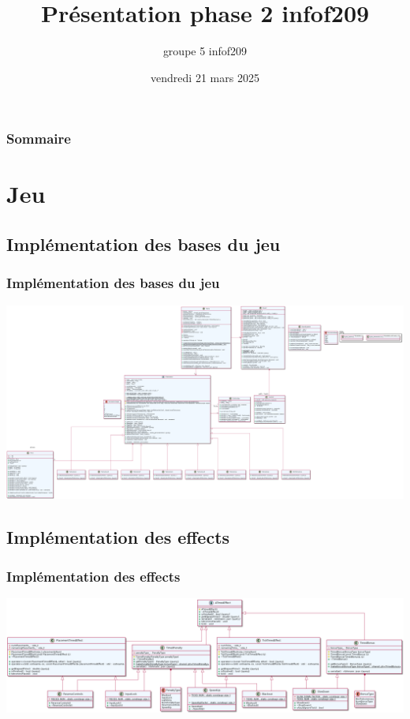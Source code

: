 \documentclass{beamer}
\title{Présentation phase 2 \textbf{infof209}}
\author{groupe 5 infof209}
\date{vendredi 21 mars 2025}
\begin{document}
\begin{frame}
\titlepage
\end{frame}

\begin{frame}[shrink=20]
\frametitle{Sommaire}
	\tableofcontents
\end{frame}

\section{Jeu}

\subsection{Implémentation des bases du jeu}
\begin{frame}
\frametitle{Implémentation des bases du jeu}

\includegraphics[width=1\textwidth]{../../res/uml/class/GameClass.png}

\end{frame}


\subsection{Implémentation des effects}
\begin{frame}
\frametitle{Implémentation des effects}

\includegraphics[width=1\textwidth]{../../res/uml/class/EffectClass.png}	
\end{frame}
\end{document}
